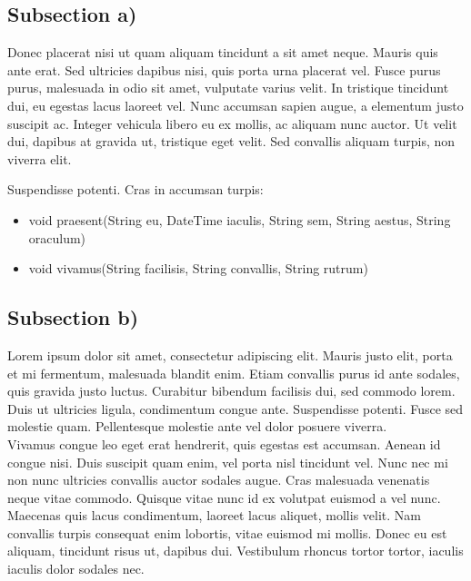 \documentclass{article} %
\begin{document}
\subsection{Subsection a)}
Donec placerat nisi ut quam aliquam tincidunt a sit amet neque. Mauris quis ante erat. Sed ultricies dapibus nisi, quis porta urna placerat vel. Fusce purus purus, malesuada in odio sit amet, vulputate varius velit. In tristique tincidunt dui, eu egestas lacus laoreet vel. Nunc accumsan sapien augue, a elementum justo suscipit ac. Integer vehicula libero eu ex mollis, ac aliquam nunc auctor. Ut velit dui, dapibus at gravida ut, tristique eget velit. Sed convallis aliquam turpis, non viverra elit. 
\\

{\color{blue}
	\renewcommand\labelitemi{}

	Suspendisse potenti. Cras in accumsan turpis:
	{\selectfont\small
	\begin{itemize}
		\item void praesent(String eu, DateTime iaculis, String sem, String aestus, String oraculum)
		\item void vivamus(String facilisis, String convallis, String rutrum)
	\end{itemize}
	}
}

\subsection{Subsection b)}
Lorem ipsum dolor sit amet, consectetur adipiscing elit. Mauris justo elit, porta et mi fermentum, malesuada blandit enim. Etiam convallis purus id ante sodales, quis gravida justo luctus. Curabitur bibendum facilisis dui, sed commodo lorem. Duis ut ultricies ligula, condimentum congue ante. Suspendisse potenti. Fusce sed molestie quam. Pellentesque molestie ante vel dolor posuere viverra. 
\\

Vivamus congue leo eget erat hendrerit, quis egestas est accumsan. Aenean id congue nisi. Duis suscipit quam enim, vel porta nisl tincidunt vel. Nunc nec mi non nunc ultricies convallis auctor sodales augue. Cras malesuada venenatis neque vitae commodo. Quisque vitae nunc id ex volutpat euismod a vel nunc. Maecenas quis lacus condimentum, laoreet lacus aliquet, mollis velit. Nam convallis turpis consequat enim lobortis, vitae euismod mi mollis. Donec eu est aliquam, tincidunt risus ut, dapibus dui. Vestibulum rhoncus tortor tortor, iaculis iaculis dolor sodales nec.
\end{document}
